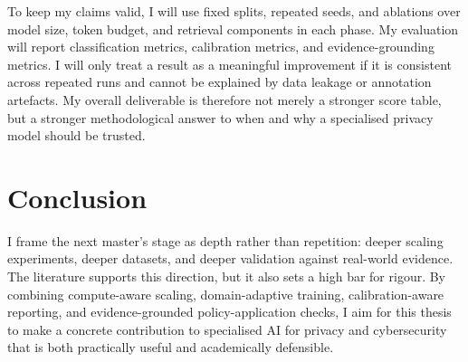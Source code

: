 \documentclass[12pt]{article}
\begin{document}
To keep my claims valid, I will use fixed splits, repeated seeds, and ablations over model size, token budget, and retrieval components in each phase. My evaluation will report classification metrics, calibration metrics, and evidence-grounding metrics. I will only treat a result as a meaningful improvement if it is consistent across repeated runs and cannot be explained by data leakage or annotation artefacts. My overall deliverable is therefore not merely a stronger score table, but a stronger methodological answer to when and why a specialised privacy model should be trusted.

\section{Conclusion}
I frame the next master's stage as depth rather than repetition: deeper scaling experiments, deeper datasets, and deeper validation against real-world evidence. The literature supports this direction, but it also sets a high bar for rigour. By combining compute-aware scaling, domain-adaptive training, calibration-aware reporting, and evidence-grounded policy-application checks, I aim for this thesis to make a concrete contribution to specialised AI for privacy and cybersecurity that is both practically useful and academically defensible.



\end{document}
